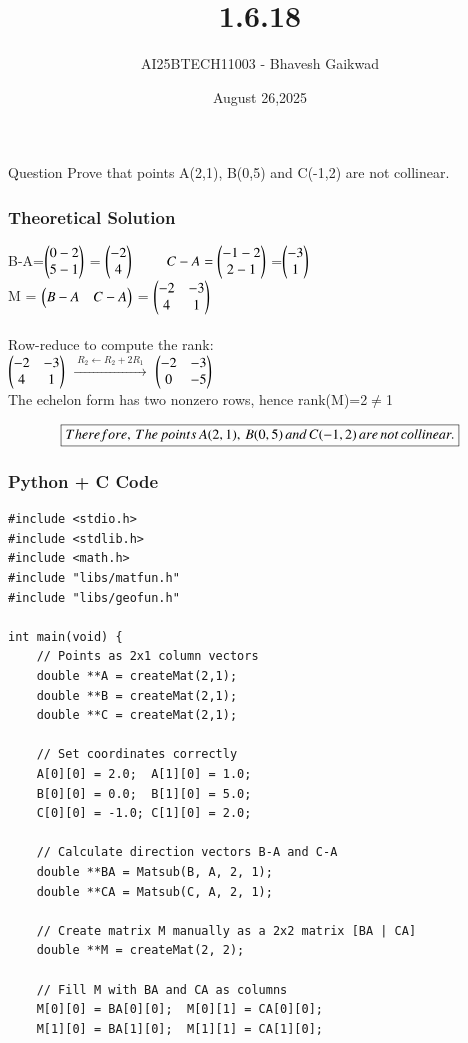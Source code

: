 \documentclass{beamer}
\title
{1.6.18}
\date{August 26,2025}
\author 
{AI25BTECH11003 - Bhavesh Gaikwad}
\begin{document}
\frame{\titlepage}
\begin{frame}{Question}
\centering
Prove that points A(2,1), B(0,5) and C(-1,2) are not collinear.
\end{frame}


\begin{frame}[fragile]
    \frametitle{Theoretical Solution}
B-A=$\begin{pmatrix}0-2 \\ 5-1\end{pmatrix}$ = $\begin{pmatrix}-2 \\ 4\end{pmatrix}$
$\qquad C-A=\begin{pmatrix}-1-2 \\ 2-1\end{pmatrix}$ =$\begin{pmatrix}-3 \\ 1\end{pmatrix}$ \\
M = $\begin{pmatrix}B-A & C-A\end{pmatrix}$ = $\begin{pmatrix}-2 & -3 \\ 4 & 1\end{pmatrix}$\\\\

Row-reduce to compute the rank:\\

$\begin{pmatrix}-2 & -3\\ 4 & 1\end{pmatrix}$ $\xrightarrow{\;R_2\leftarrow R_2+2R_1\;}$ $\begin{pmatrix}-2 & -3 \\ 0 & -5\end{pmatrix}$\\

The echelon form has two nonzero rows, hence
rank(M)=2$\neq$1

\begin{align}
    \centering
    \boxed{Therefore, \, The \, points \, A(2,1), \,B(0,5) \, and \, C(-1,2) \, are \, not \, collinear.}
\end{align}
\end{frame}


\begin{frame}[fragile]
    \frametitle{Python + C Code}
    \begin{lstlisting}
#include <stdio.h>
#include <stdlib.h>
#include <math.h>
#include "libs/matfun.h"
#include "libs/geofun.h"

int main(void) {
    // Points as 2x1 column vectors
    double **A = createMat(2,1);
    double **B = createMat(2,1);
    double **C = createMat(2,1);

    // Set coordinates correctly
    A[0][0] = 2.0;  A[1][0] = 1.0;
    B[0][0] = 0.0;  B[1][0] = 5.0;
    C[0][0] = -1.0; C[1][0] = 2.0;

    // Calculate direction vectors B-A and C-A
    double **BA = Matsub(B, A, 2, 1);
    double **CA = Matsub(C, A, 2, 1);

    // Create matrix M manually as a 2x2 matrix [BA | CA]
    double **M = createMat(2, 2);
    
    // Fill M with BA and CA as columns
    M[0][0] = BA[0][0];  M[0][1] = CA[0][0];
    M[1][0] = BA[1][0];  M[1][1] = CA[1][0];

    
 \end{lstlisting}
\end{frame}
\end{document}
